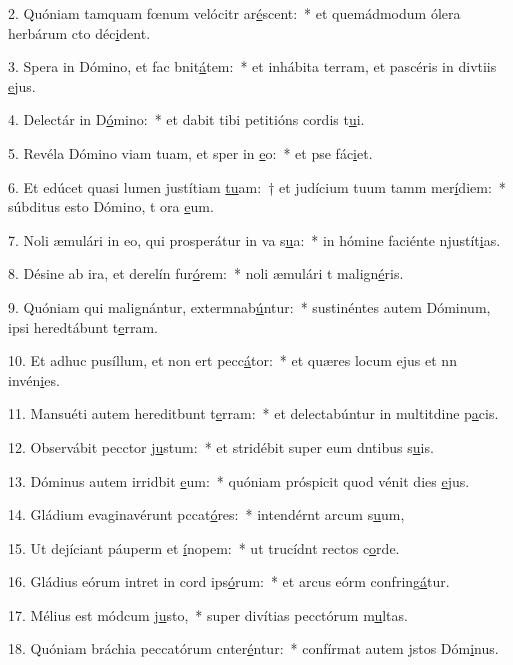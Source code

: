 2. Quóniam tamquam fœnum velócitr ar\uline{é}scent:~* et quemádmodum ólera herbárum cto déc\uline{i}dent.\par 
3. Spera in Dómino, et fac bnit\uline{á}tem:~* et inhábita terram, et pascéris in divtiis \uline{e}jus.\par 
4. Delectár in D\uline{ó}mino:~* et dabit tibi petitións cordis t\uline{u}i.\par 
5. Revéla Dómino viam tuam, et sper in \uline{e}o:~* et pse fác\uline{i}et.\par 
6. Et edúcet quasi lumen justítiam \uline{tu}am:~† et judícium tuum tamm mer\uline{í}diem:~* súbditus esto Dómino, t ora \uline{e}um.\par 
7. Noli æmulári in eo, qui prosperátur in va s\uline{u}a:~* in hómine faciénte njustít\uline{i}as.\par 
8. Désine ab ira, et derelín fur\uline{ó}rem:~* noli æmulári t malign\uline{é}ris.\par 
9. Quóniam qui malignántur, extermnab\uline{ú}ntur:~* sustinéntes autem Dóminum, ipsi heredtábunt t\uline{e}rram.\par 
10. Et adhuc pusíllum, et non ert pecc\uline{á}tor:~* et quæres locum ejus et nn invén\uline{i}es.\par 
11. Mansuéti autem hereditbunt t\uline{e}rram:~* et delectabúntur in multitdine p\uline{a}cis.\par 
12. Observábit pecctor j\uline{u}stum:~* et stridébit super eum dntibus s\uline{u}is.\par 
13. Dóminus autem irridbit \uline{e}um:~* quóniam próspicit quod vénit dies \uline{e}jus.\par 
14. Gládium evaginavérunt pccat\uline{ó}res:~* intendérnt arcum s\uline{u}um,\par 
15. Ut dejíciant páuperm et \uline{í}nopem:~* ut trucídnt rectos c\uline{o}rde.\par 
16. Gládius eórum intret in cord ips\uline{ó}rum:~* et arcus eórm confring\uline{á}tur.\par 
17. Mélius est módcum j\uline{u}sto,~* super divítias pecctórum m\uline{u}ltas.\par 
18. Quóniam bráchia peccatórum cnter\uline{é}ntur:~* confírmat autem jstos Dóm\uline{i}nus.\par 

